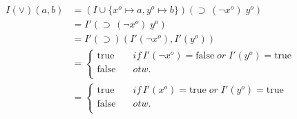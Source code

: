 \documentclass[11pt,a4paper]{article}
\newcommand{\lto}{\supset}
\newcommand{\sor}{ \; or \;}
\begin{document}
\begin{align*}
I(\lor)(a,b)& = (I \cup \{ x^o \mapsto a, y^o \mapsto b\})(\lto \, ( \neg x^o) \; y^o)  \\
& = I'(\lto \, ( \neg x^o) \; y^o)  \\
& = I'(\lto) (I'( \neg x^o), I'(y^o))  \\
& = \begin{cases}
\text{true} & \quad \mathit{if}\, I'(\neg x^o)=\text{false} \sor  I'(y^o)=\text{true} \\
\text{false} & \quad otw.\\
\end{cases} \\
& = \begin{cases}
\text{true} & \quad \mathit{if}\, I'(x^o)=\text{true} \sor  I'(y^o)=\text{true} \\
\text{false} & \quad otw.\\
\end{cases}
\end{align*}
\end{document}
